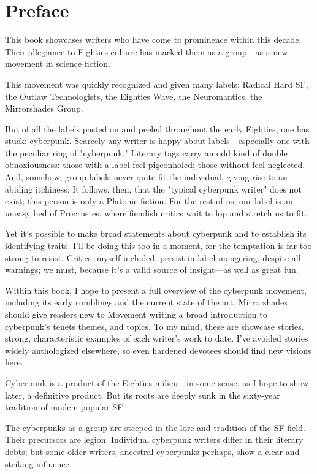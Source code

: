 \chapter{Preface}

This book showcases writers who have come to prominence within this decade. Their allegiance to Eighties culture has marked them as a group—as a new movement in science fiction.

This movement was quickly recognized and given many labels: Radical Hard SF, the Outlaw Technologists, the Eighties Wave, the Neuromantics, the Mirrorshades Group.

But of all the labels pasted on and peeled throughout the early Eighties, one has stuck: cyberpunk.
Scarcely any writer is happy about labels—especially one with the peculiar ring of "cyberpunk." Literary tags carry an odd kind of double obnoxiousness: those with a label feel pigeonholed; those without feel neglected. And, somehow, group labels never quite fit the individual, giving rise to an abiding itchiness. It follows, then, that the "typical cyberpunk writer" does not exist; this person is only a Platonic fiction. For the rest of us, our label is an uneasy bed of Procrustes, where fiendish critics wait to lop and stretch us to fit.

Yet it's possible to make broad statements about cyberpunk and to establish its identifying traits. I'll be doing this too in a moment, for the temptation is far too strong to resist. Critics, myself included, persist in label-mongering, despite all warnings; we must, because it's a valid source of insight—as well as great fun.

Within this book, I hope to present a full overview of the cyberpunk movement, including its early rumblings and the current state of the art. Mirrorshades should give readers new to Movement writing a broad introduction to cyberpunk's tenets themes, and topics. To my mind, these are showcase stories. strong, characteristic examples of each writer's work to date. I've avoided stories widely anthologized elsewhere, so even hardened devotees should find new visions here.

Cyberpunk is a product of the Eighties milieu—in some sense, as I hope to show later, a definitive product. But its roots are deeply sunk in the sixty-year tradition of modem popular SF.

The cyberpunks as a group are steeped in the lore and tradition of the SF field. Their precursors are legion. Individual cyberpunk writers differ in their literary debts; but some older writers, ancestral cyberpunks perhaps, show a clear and striking influence.

